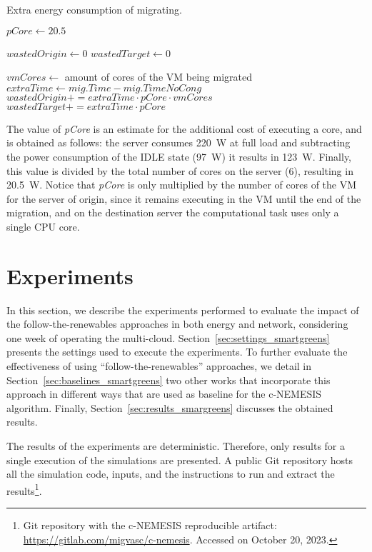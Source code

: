 \begin{algorithm}[h]
\begin{algorithmic}
\caption{Extra energy consumption of migrating.}\label{alg:wasted_energy}

\State $pCore \gets 20.5$

\State $wastedOrigin \gets 0$
\State $wastedTarget \gets 0$

    \State $vmCores \gets$ amount of cores of the VM being migrated
    \State $extraTime \gets mig.Time - mig.TimeNoCong$
        \State $wastedOrigin += extraTime \cdot pCore \cdot vmCores$ 
        \State $wastedTarget += extraTime \cdot pCore$ 
    \EndIf
\EndFor
\end{algorithmic}
\end{algorithm}

The value of \textit{pCore} is an estimate for the additional cost of executing a core, and is obtained as follows: the server consumes \SI{220}{\watt} at full load and subtracting the power consumption of the IDLE state (\SI{97}{\watt}) it results in \SI{123}{\watt}. Finally, this value is divided by the total number of cores on the server (6), resulting in \SI{20.5}{\watt}. Notice that \textit{pCore} is only multiplied by the number of cores of the VM for the server of origin, since it remains executing in the VM until the end of the migration, and on the destination server the computational task uses only a single CPU core.

\section{Experiments}

\label{sec:simulations_smargreens}

In this section, we describe the experiments performed to evaluate the impact of the follow-the-renewables approaches in both energy and network, considering one week of operating the multi-cloud. Section~\ref{sec:settings_smartgreens} presents the settings used to execute the experiments. To further evaluate the effectiveness of using ``follow-the-renewables'' approaches, we detail in Section~\ref{sec:baselines_smartgreens} two other works that incorporate this approach in different ways that are used as baseline for the c-NEMESIS algorithm. Finally, Section~\ref{sec:results_smargreens} discusses the obtained results. 
 
 The results of the experiments are deterministic. Therefore, only results for a single execution of the simulations are presented. A public Git repository hosts all the simulation code, inputs, and the instructions to run and extract the results\footnote{Git repository with the c-NEMESIS reproducible artifact: \url{https://gitlab.com/migvasc/c-nemesis}. Accessed on October 20, 2023.}. 


